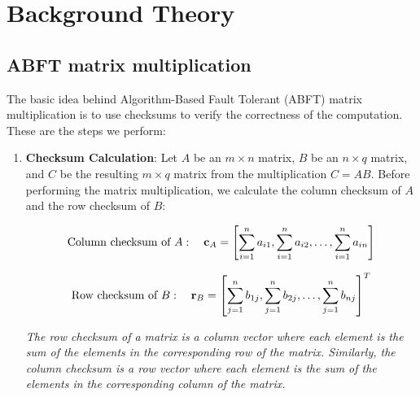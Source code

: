 \section{Background Theory}
\label{sec:background}

\subsection{ABFT matrix multiplication}

The basic idea behind Algorithm-Based Fault Tolerant (ABFT) matrix multiplication
is to use checksums to verify the correctness of the computation.
These are the steps we perform:

\begin{enumerate}
  \item \textbf{Checksum Calculation}:
    Let \( A \) be an \( m \times n \) matrix,
    \( B \) be an \( n \times q \) matrix,
    and \( C \) be the resulting \( m \times q \) matrix
    from the multiplication \( C = A B \).
    Before performing the matrix multiplication,
    we calculate the column checksum of \( A \) and the row checksum of \( B \):

    \[
      \textnormal{Column checksum of } A: \quad
      \mathbf{c}_A =
      \left[
        \sum_{i=1}^{n} a_{i1},
        \sum_{i=1}^{n} a_{i2},
        \ldots, \sum_{i=1}^{n} a_{in}
      \right]
    \]

    \[
      \textnormal{Row checksum of } B: \quad
      \mathbf{r}_B = \left[ \sum_{j=1}^{n} b_{1j}, \sum_{j=1}^{n} b_{2j}, \ldots, \sum_{j=1}^{n} b_{nj} \right]^T
    \]

    \textit{
      The row checksum of a matrix is a column vector where each element
      is the sum of the elements in the corresponding row of the matrix.
      Similarly, the column checksum is a row vector where
    each element is the sum of the elements in the corresponding column of the matrix.}


\end{enumerate}

